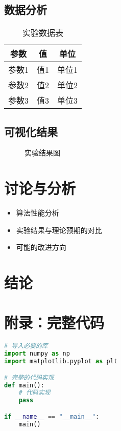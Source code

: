 \documentclass[letterpaper,12pt]{article}
\begin{document}
\subsection{数据分析}

\begin{table}[h]
    \centering
    \caption{实验数据表}
    \begin{tabular}{@{}ccc@{}}
    \toprule
    参数 & 值 & 单位 \\
    \midrule
    参数1 & 值1 & 单位1 \\
    参数2 & 值2 & 单位2 \\
    参数3 & 值3 & 单位3 \\
    \bottomrule
    \end{tabular}
\end{table}

\subsection{可视化结果}
\begin{figure}[h]
    \centering
    \caption{实验结果图}
    \label{fig:result}
\end{figure}

\section{讨论与分析}
\begin{itemize}
    \item 算法性能分析
    \item 实验结果与理论预期的对比
    \item 可能的改进方向
\end{itemize}

\section{结论}

\appendix %
\section{附录：完整代码}
\begin{lstlisting}[language=Python, caption=完整代码]
# 导入必要的库
import numpy as np
import matplotlib.pyplot as plt

# 完整的代码实现
def main():
    # 代码实现
    pass

if __name__ == "__main__":
    main()
\end{lstlisting}
\end{document}
